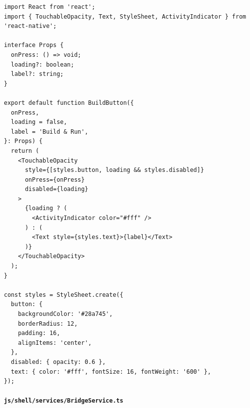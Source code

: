 \documentclass[11pt]{article}
\begin{document}
\begin{verbatim}
import React from 'react';
import { TouchableOpacity, Text, StyleSheet, ActivityIndicator } from 'react-native';

interface Props {
  onPress: () => void;
  loading?: boolean;
  label?: string;
}

export default function BuildButton({
  onPress,
  loading = false,
  label = 'Build & Run',
}: Props) {
  return (
    <TouchableOpacity
      style={[styles.button, loading && styles.disabled]}
      onPress={onPress}
      disabled={loading}
    >
      {loading ? (
        <ActivityIndicator color="#fff" />
      ) : (
        <Text style={styles.text}>{label}</Text>
      )}
    </TouchableOpacity>
  );
}

const styles = StyleSheet.create({
  button: {
    backgroundColor: '#28a745',
    borderRadius: 12,
    padding: 16,
    alignItems: 'center',
  },
  disabled: { opacity: 0.6 },
  text: { color: '#fff', fontSize: 16, fontWeight: '600' },
});
\end{verbatim}

\paragraph{\texttt{js/shell/services/BridgeService.ts}}
\end{document}
